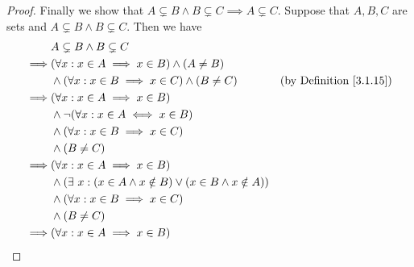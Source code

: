 \begin{proof}
    Finally we show that \(A \subsetneq B \land B \subsetneq C \implies A \subsetneq C\).
    Suppose that \(A, B, C\) are sets and \(A \subsetneq B \land B \subsetneq C\).
    Then we have
    \begin{align*}
                 & A \subsetneq B \land B \subsetneq C                                                                                                       \\
        \implies & (\forall x : x \in A \implies x \in B) \land (A \neq B)                                                                                   \\
                 & \land (\forall x : x \in B \implies x \in C) \land (B \neq C)                   & \text{(by Definition \ref{3.1.15})}                     \\
        \implies & (\forall x : x \in A \implies x \in B)                                                                                                    \\
                 & \land \lnot(\forall x : x \in A \iff x \in B)                                                                                             \\
                 & \land (\forall x : x \in B \implies x \in C)                                                                                              \\
                 & \land (B \neq C)                                                                                                                          \\
        \implies & (\forall x : x \in A \implies x \in B)                                                                                                    \\
                 & \land (\exists\ x : (x \in A \land x \notin B) \lor (x \in B \land x \notin A))                                                           \\
                 & \land (\forall x : x \in B \implies x \in C)                                                                                              \\
                 & \land (B \neq C)                                                                                                                          \\
        \implies & (\forall x : x \in A \implies x \in B)                                                                                                    \\

\end{align*}
\end{proof}

